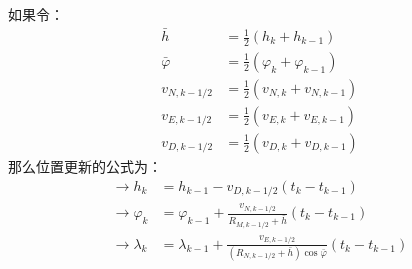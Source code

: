 \documentclass[12pt, twocolumn]{article}
\newcommand{\normf}{\kaishu}
\begin{document}
	\section{\normf{位置更新}}
	如果令：
	\begin{equation*}
		\begin{aligned}
			\bar{h}&=\frac{1}{2}(h_k+h_{k-1})\\
			\bar{\varphi}&=\frac{1}{2}(\varphi_k+\varphi_{k-1})\\
			v_{N,k-1/2}&=\frac{1}{2}(v_{N,k}+v_{N,k-1})\\
			v_{E,k-1/2}&=\frac{1}{2}(v_{E,k}+v_{E,k-1})\\
			v_{D,k-1/2}&=\frac{1}{2}(v_{D,k}+v_{D,k-1})
		\end{aligned}
	\end{equation*}
	那么位置更新的公式为：
	\begin{equation*}
		\begin{aligned}
			\to h_k&=h_{k-1}-v_{D,k-1/2}(t_k-t_{k-1})\\
			\to \varphi_k&=\varphi_{k-1}+\frac{v_{N,k-1/2}}{R_{M,k-1/2}+\bar{h}}(t_k-t_{k-1})\\
			\to \lambda_k&=\lambda_{k-1}+\frac{v_{E,k-1/2}}{(R_{N,k-1/2}+\bar{h})\cos\bar{\varphi}}(t_k-t_{k-1})
		\end{aligned}
	\end{equation*}
\end{document}
